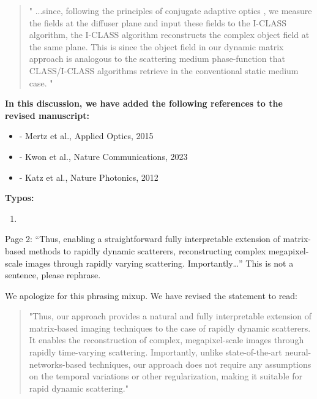 \documentclass[12pt]{article}
\newenvironment{solved_reviewercomment}
    {\begin{tcolorbox}[width=\linewidth,colback=gray!5,colframe=solved_commentcolor!50,title=Reviewer Comment,left=5pt,right=5pt]}
    {\end{tcolorbox}}
\newenvironment{finished_ourresponse}
    {\begin{tcolorbox}[width=\linewidth,breakable,enhanced,colback=gray!5,colframe=finished_responsecolor!50,title=Response,left=5pt,right=5pt]}
    {\end{tcolorbox}}
\begin{document}
\begin{finished_ourresponse}
    \begin{quote}
        "
        ...since, following the principles of conjugate adaptive optics \cite{mertz2015field, kwon2023computational, sunray2024beyond, katz2012looking}, we measure the fields at the diffuser plane and input these fields to the I-CLASS algorithm, the I-CLASS algorithm reconstructs the complex object field at the same plane. This is since the object field in our dynamic matrix approach is analogous to the scattering medium phase-function that CLASS/I-CLASS algorithms retrieve in the conventional static medium case.
        "
    \end{quote}
    \textbf{In this discussion, we have added the following references to the revised manuscript:}
    \begin{itemize}[nosep]
    \item \cite{mertz2015field} - Mertz et al., Applied Optics, 2015
    \item \cite{kwon2023computational} - Kwon et al., Nature Communications, 2023
    \item \cite{katz2012looking} - Katz et al., Nature Photonics, 2012
    \end{itemize}
\end{finished_ourresponse}


\textbf{Typos:}

\begin{enumerate}[label=\arabic*., resume]
\item \leavevmode
\end{enumerate}
\vspace{-1em}
\begin{solved_reviewercomment}
    Page 2: “Thus, enabling a straightforward fully interpretable extension of matrix-based methods to rapidly dynamic scatterers, reconstructing complex megapixel-scale images through rapidly varying scattering. Importantly…” This is not a sentence, please rephrase.
\end{solved_reviewercomment}

\begin{finished_ourresponse}
    We apologize for this phrasing mixup. We have revised the statement to read:
    
    \begin{quote}
        "Thus, our approach provides a natural and fully interpretable extension of matrix-based imaging techniques to the case of rapidly dynamic scatterers. 
        It enables the reconstruction of complex, megapixel-scale images through rapidly time-varying scattering. Importantly, unlike state-of-the-art neural-networks-based techniques, our approach does not require any assumptions on the temporal variations or other regularization, making it suitable for rapid dynamic scattering."
    \end{quote}
    
\end{finished_ourresponse}
\end{document}
